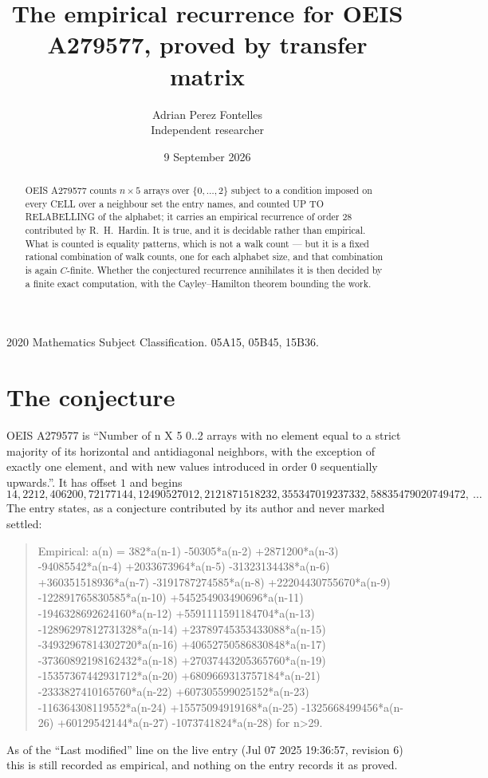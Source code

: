 \documentclass[11pt,a4paper]{article}
\title{The empirical recurrence for OEIS A279577, proved by transfer matrix}
\author{Adrian Perez Fontelles\\ \small Independent researcher}
\date{9 September 2026}
\theoremstyle{plain}
\theoremstyle{definition}
\begin{document}
\maketitle

\begin{abstract}
OEIS A279577 counts $n\times5$ arrays over $\{0,\dots,2\}$ subject to a condition imposed on
every CELL over a neighbour set the entry names, and counted UP TO RELABELLING of the
alphabet; it carries an empirical recurrence of order $28$ contributed by
R.~H.~Hardin. It is true, and it is decidable rather than empirical. What is counted is
equality patterns, which is not a walk count --- but it is a fixed rational combination of
walk counts, one for each alphabet size, and that combination is again $C$-finite. Whether the
conjectured recurrence annihilates it is then decided by a finite exact computation, with the
Cayley--Hamilton theorem bounding the work.
\end{abstract}

\noindent\small 2020 Mathematics Subject Classification. 05A15, 05B45, 15B36.\normalsize

\section{The conjecture}

OEIS A279577 is ``Number of n X 5 0..2 arrays with no element equal to a strict majority of its horizontal and antidiagonal neighbors, with the exception of exactly one element, and with new values introduced in order 0 sequentially upwards.''. It has offset $1$ and begins
\[
14, 2212, 406200, 72177144, 12490527012, 2121871518232, 355347019237332, 58835479020749472,\ \dots
\]
The entry states, as a conjecture contributed by its author and never marked settled:
\begin{quote}
Empirical: a(n) = 382*a(n-1) -50305*a(n-2) +2871200*a(n-3) -94085542*a(n-4) +2033673964*a(n-5) -31323134438*a(n-6) +360351518936*a(n-7) -3191787274585*a(n-8) +22204430755670*a(n-9) -122891765830585*a(n-10) +545254903490696*a(n-11) -1946328692624160*a(n-12) +5591111591184704*a(n-13) -12896297812731328*a(n-14) +23789745353433088*a(n-15) -34932967814302720*a(n-16) +40652750586830848*a(n-17) -37360892198162432*a(n-18) +27037443205365760*a(n-19) -15357367442931712*a(n-20) +6809669313757184*a(n-21) -2333827410165760*a(n-22) +607305599025152*a(n-23) -116364308119552*a(n-24) +15575094919168*a(n-25) -1325668499456*a(n-26) +60129542144*a(n-27) -1073741824*a(n-28) for n>29.
\end{quote}
As of the ``Last modified'' line on the live entry (Jul 07 2025 19:36:57, revision 6) this is still
recorded as empirical, and nothing on the entry records it as proved.
\end{document}
